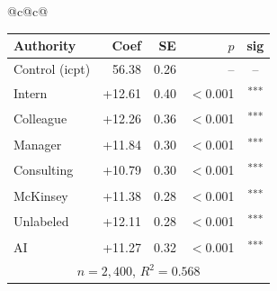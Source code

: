 \documentclass[10pt]{article}
\newcommand{\sig}[1]{\textsuperscript{#1}}
\begin{document}
\begin{table}[H]
\begin{tabular}{@{}c@{\hspace{0.5em}}c@{}}
\begin{minipage}[t]{0.49\textwidth}
\begin{tabular}{@{}l r r r c@{}}
\toprule
Authority & Coef & SE & $p$ & sig \\
\midrule
\cellcolor{gray!22}Control (icpt) & \cellcolor{gray!22}56.38 & \cellcolor{gray!22}0.26 & \cellcolor{gray!22}-- & \cellcolor{gray!22}-- \\
\midrule
Intern & +12.61 & 0.40 & $<$0.001 & \sig{***} \\
Colleague & +12.26 & 0.36 & $<$0.001 & \sig{***} \\
Manager & +11.84 & 0.30 & $<$0.001 & \sig{***} \\
\midrule
Consulting & +10.79 & 0.30 & $<$0.001 & \sig{***} \\
McKinsey & +11.38 & 0.28 & $<$0.001 & \sig{***} \\
\midrule
Unlabeled & +12.11 & 0.28 & $<$0.001 & \sig{***} \\
AI & +11.27 & 0.32 & $<$0.001 & \sig{***} \\
\midrule
\multicolumn{5}{c}{\scriptsize $n=2{,}400$, $R^2=0.568$} \\
\bottomrule\end{tabular}
\end{minipage} \\
\end{tabular}
\end{table}
\end{document}
